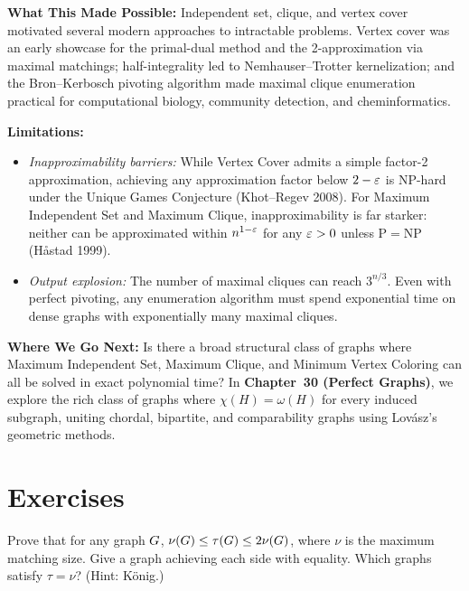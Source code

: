 \begin{connectionbox}
\textbf{What This Made Possible:}
Independent set, clique, and vertex cover motivated several modern approaches to
intractable problems. Vertex cover was an early showcase for the primal-dual method and the 2-approximation
via maximal matchings; half-integrality led to Nemhauser--Trotter kernelization;
and the Bron--Kerbosch pivoting algorithm made maximal clique enumeration practical for
computational biology, community detection, and cheminformatics.

\textbf{Limitations:}
\begin{itemize}
  \item \emph{Inapproximability barriers:} While Vertex Cover admits a simple factor-2 approximation,
        achieving any approximation factor below $2 - \varepsilon$ is NP-hard under the Unique Games
        Conjecture (Khot--Regev 2008). For Maximum Independent Set and Maximum Clique, inapproximability
        is far starker: neither can be approximated within $n^{1-\varepsilon}$ for any $\varepsilon > 0$
        unless $\mathrm{P} = \mathrm{NP}$ (H{\aa}stad 1999).
  \item \emph{Output explosion:} The number of maximal cliques can reach $3^{n/3}$. Even with
        perfect pivoting, any enumeration algorithm must spend exponential time on dense graphs
        with exponentially many maximal cliques.
\end{itemize}

\textbf{Where We Go Next:}
Is there a broad structural class of graphs where Maximum Independent Set, Maximum Clique, and
Minimum Vertex Coloring can all be solved in exact polynomial time?
In \textbf{Chapter~30 (Perfect Graphs)}, we explore the rich class of graphs
where $\chi(H) = \omega(H)$ for every induced subgraph, uniting chordal, bipartite, and
comparability graphs using Lov{\'a}sz's geometric methods.
\end{connectionbox}

\section*{Exercises}

\begin{exercise}
Prove that for any graph $G$, $\nu(G)\le\tau(G)\le 2\nu(G)$, where
$\nu$ is the maximum matching size. Give a graph achieving each side with
equality. Which graphs satisfy $\tau=\nu$? (Hint: K\"onig.)
\end{exercise}

